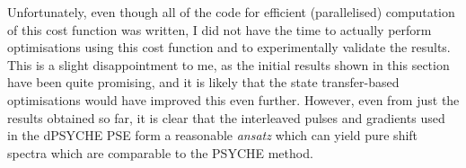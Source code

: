 Unfortunately, even though all of the code for efficient (parallelised) computation of this cost function was written, I did not have the time to actually perform optimisations using this cost function and to experimentally validate the results.
This is a slight disappointment to me, as the initial results shown in this section have been quite promising, and it is likely that the state transfer-based optimisations would have improved this even further.
However, even from just the results obtained so far, it is clear that the interleaved pulses and gradients used in the dPSYCHE PSE form a reasonable \textit{ansatz} which can yield pure shift spectra which are comparable to the PSYCHE method.
